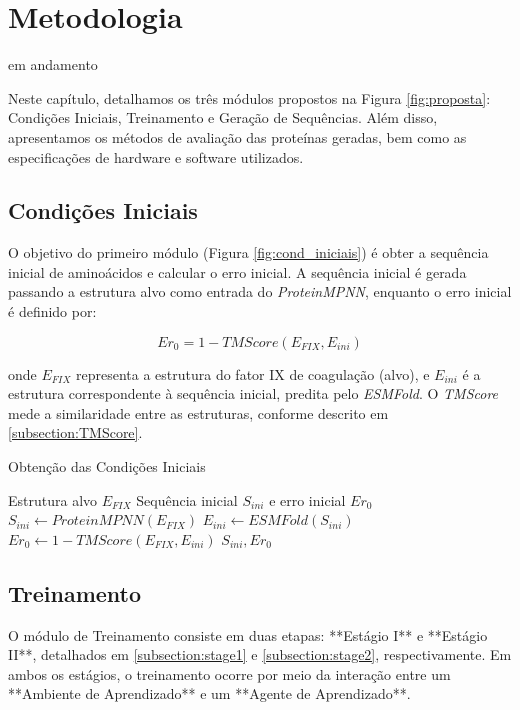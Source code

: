 \chapter{Metodologia}
em andamento  
 
Neste capítulo, detalhamos os três módulos propostos na Figura \ref{fig:proposta}: 
Condições Iniciais, Treinamento e Geração de Sequências. 
Além disso, apresentamos os métodos de avaliação das proteínas geradas, 
bem como as especificações de hardware e software utilizados.  

\section{Condições Iniciais}

O objetivo do primeiro módulo (Figura \ref{fig:cond_iniciais}) é obter a sequência inicial de aminoácidos e calcular o erro inicial. 
A sequência inicial é gerada passando a estrutura alvo como entrada do \textit{ProteinMPNN}, 
enquanto o erro inicial é definido por:  

\begin{equation}
    Er_{0} = 1 - TMScore(E_{FIX}, E_{ini})
\end{equation}

\noindent
onde $E_{FIX}$ representa a estrutura do fator IX de coagulação (alvo), e $E_{ini}$ é a estrutura correspondente à sequência inicial, predita pelo \textit{ESMFold}. O \textit{TMScore} mede a similaridade entre as estruturas, conforme descrito em \ref{subsection:TMScore}.  
 
\begin{algorithm}
    \caption{Obtenção das Condições Iniciais}
    \label{alg:initial_conditions}
    \begin{algorithmic}[1]
    \Require Estrutura alvo $E_{FIX}$
    \Ensure Sequência inicial $S_{ini}$ e erro inicial $Er_{0}$
    \State $S_{ini} \gets \textit{ProteinMPNN}(E_{FIX})$
    \State $E_{ini} \gets \textit{ESMFold}(S_{ini})$
    \State $Er_{0} \gets 1 - \textit{TMScore}(E_{FIX}, E_{ini})$
    \Return $S_{ini}, Er_{0}$
    \end{algorithmic}
    \end{algorithm}
    
\section{Treinamento}
O módulo de Treinamento consiste em duas etapas: 
**Estágio I** e **Estágio II**, 
detalhados em \ref{subsection:stage1} e \ref{subsection:stage2}, respectivamente. 
Em ambos os estágios, o treinamento ocorre por meio da interação 
entre um **Ambiente de Aprendizado** e um **Agente de Aprendizado**.

